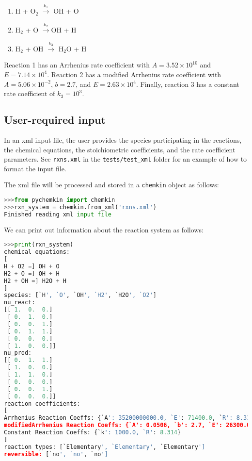 \documentclass[12pt]{article}
\begin{document}
\begin{enumerate}
\item H + O$_2$ $\overset{k_1}{\rightarrow}$ OH + O
\item H$_2$ + O $\overset{k_2}{\rightarrow}$OH + H
\item H$_2$ + OH $\overset{k_3}{\rightarrow}$ H$_2$O + H
\end{enumerate}

Reaction 1 has an Arrhenius rate coefficient with $A = 3.52\times 10^{10}$ and $E = 7.14\times 10^4$. Reaction 2 has a modified Arrhenius rate coefficient with $A = 5.06\times 10^{-2}$, $b = 2.7$, and $E = 2.63\times10^4$. Finally, reaction 3 has a constant rate coefficient of $k_3 = 10^3$.



\subsection{User-required input}
In an xml input file, the user provides the species participating in the reactions, the chemical equations, the stoichiometric coefficients, and the rate coefficient parameters. See {\tt rxns.xml} in the {\tt tests/test\_xml} folder for an example of how to format the input file. 

The xml file will be processed and stored in a {\tt chemkin} object as follows:
\begin{lstlisting}[language = Python, basicstyle = \ttfamily, breaklines = True, columns = fullflexible]
>>>from pychemkin import chemkin
>>>rxn_system = chemkin.from_xml('rxns.xml')
Finished reading xml input file
\end{lstlisting}

We can print out information about the reaction system as follows:
\begin{lstlisting}[language = Python, basicstyle = \ttfamily,columns = fullflexible, showstringspaces = False]
>>>print(rxn_system)
chemical equations:
[
H + O2 =] OH + O
H2 + O =] OH + H
H2 + OH =] H2O + H
]
species: [`H', `O', `OH', `H2', `H2O', `O2']
nu_react:
[[ 1.  0.  0.]
 [ 0.  1.  0.]
 [ 0.  0.  1.]
 [ 0.  1.  1.]
 [ 0.  0.  0.]
 [ 1.  0.  0.]]
nu_prod:
[[ 0.  1.  1.]
 [ 1.  0.  0.]
 [ 1.  1.  0.]
 [ 0.  0.  0.]
 [ 0.  0.  1.]
 [ 0.  0.  0.]]
reaction coefficients:
[
Arrhenius Reaction Coeffs: {`A': 35200000000.0, `E': 71400.0, `R': 8.314}
modifiedArrhenius Reaction Coeffs: {`A': 0.0506, `b': 2.7, `E': 26300.0, `R': 8.314}
Constant Reaction Coeffs: {`k': 1000.0, `R': 8.314}
]
reaction types: [`Elementary', `Elementary', `Elementary']
reversible: [`no', `no', `no']
\end{lstlisting}
\end{document}
